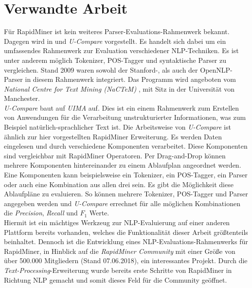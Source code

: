 %
\chapter{Verwandte Arbeit}
\label{sec:related}

Für RapidMiner ist kein weiteres Parser-Evaluations-Rahmenwerk bekannt. Dagegen wird in \cite{ucompare1} und \cite{ucompare2} \textit{U-Compare} vorgestellt. Es handelt sich dabei um ein umfassendes Rahmenwerk zur Evaluation verschiedener NLP-Techniken. Es ist unter anderem möglich Tokenizer, POS-Tagger und syntaktische Parser zu vergleichen. Stand 2009 waren sowohl der Stanford-, als auch der OpenNLP-Parser in diesem Rahmenwerk integriert. Das Programm wird angeboten vom \textit{National Centre for Text Mining (NaCTeM)} \cite{nactem}, mit Sitz in der Universität von Manchester.\\
\textit{U-Compare} baut auf \textit{UIMA} \cite{uima} auf. Dies ist ein einem Rahmenwerk zum Erstellen von Anwendungen für die Verarbeitung unstrukturierter Informationen, was zum Beispiel natürlich-sprachlicher Text ist. Die Arbeitsweise von \textit{U-Compare} ist ähnlich zur hier vorgestellten RapidMiner Erweiterung. Es werden Daten eingelesen und durch verschiedene Komponenten verarbeitet. Diese Komponenten sind vergleichbar mit RapidMiner Operatoren. Per Drag-and-Drop können mehrere Komponenten hintereinander zu einem Ablaufplan angeordnet werden. Eine Komponenten kann beispielsweise ein Tokenizer, ein POS-Tagger, ein Parser oder auch eine Kombination aus allen drei sein. Es gibt die Möglichkeit diese Ablaufpläne zu evaluieren. So können mehrere Tokenizer, POS-Tagger und Parser angegeben werden und \textit{U-Compare} errechnet für alle möglichen Kombinationen die \textit{Precision}, \textit{Recall} und \(F_1\) Werte. \cite{ucompare2} \cite{ucompareeval} \\
Hiermit ist ein mächtiges Werkzeug zur NLP-Evaluierung auf einer anderen Plattform bereits vorhanden, welches die Funktionalität dieser Arbeit größtenteils beinhaltet. Dennoch ist die Entwicklung eines NLP-Evaluations-Rahmenwerks für RapidMiner, in Hinblick auf die \textit{RapidMiner Community} mit einer Größe von über 500.000 Mitgliedern (Stand 07.06.2018), ein interessantes Projekt. 
Durch die \textit{Text-Processing}-Erweiterung wurde bereits erste Schritte von RapidMiner in Richtung NLP gemacht und somit dieses Feld für die Community geöffnet.